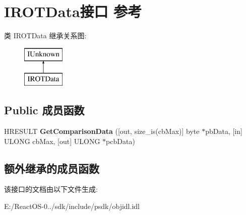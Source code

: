 \hypertarget{interface_i_r_o_t_data}{}\section{I\+R\+O\+T\+Data接口 参考}
\label{interface_i_r_o_t_data}
类 I\+R\+O\+T\+Data 继承关系图\+:\begin{figure}[H]
\begin{center}
\leavevmode
\includegraphics[height=2.000000cm]{interface_i_r_o_t_data}
\end{center}
\end{figure}
\subsection*{Public 成员函数}
\begin{DoxyCompactItemize}
\item 
\mbox{\label{interface_i_r_o_t_data_abc84482dc0686af47e517616075b87b8}} 
H\+R\+E\+S\+U\+LT {\bfseries Get\+Comparison\+Data} (\mbox{[}out, size\+\_\+is(cb\+Max)\mbox{]} byte $\ast$pb\+Data, \mbox{[}in\mbox{]} U\+L\+O\+NG cb\+Max, \mbox{[}out\mbox{]} U\+L\+O\+NG $\ast$pcb\+Data)
\end{DoxyCompactItemize}
\subsection*{额外继承的成员函数}


该接口的文档由以下文件生成\+:\begin{DoxyCompactItemize}
\item 
E\+:/\+React\+O\+S-\/0../sdk/include/psdk/objidl.\+idl\end{DoxyCompactItemize}
